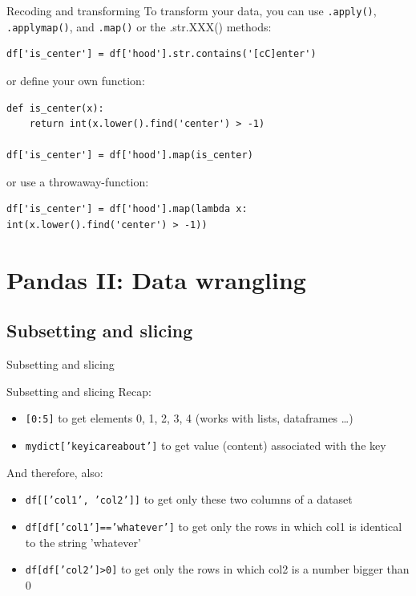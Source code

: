 \documentclass{beamer}
\begin{document}
\begin{frame}[fragile]{Recoding and transforming}
To transform your data, you can use \texttt{.apply()}, \texttt{.applymap()}, and \texttt{.map()} or the .str.XXX() methods:

\begin{lstlisting}
df['is_center'] = df['hood'].str.contains('[cC]enter')
\end{lstlisting}
or define your own function:
\begin{lstlisting}
def is_center(x):
    return int(x.lower().find('center') > -1)
    
df['is_center'] = df['hood'].map(is_center)
\end{lstlisting}
or use a throwaway-function:
\begin{lstlisting}
df['is_center'] = df['hood'].map(lambda x: int(x.lower().find('center') > -1))
\end{lstlisting}


\end{frame}




\section{Pandas II: Data wrangling}
\subsection{Subsetting and slicing}

\begin{frame}[plain]
Subsetting and slicing
\end{frame}

\begin{frame}{Subsetting and slicing}
Recap:
\begin{itemize}[<+->]
	\item \texttt{[0:5]} to get elements 0, 1, 2, 3, 4 (works with lists, dataframes \ldots)
	\item \texttt{mydict['keyicareabout']} to get value (content) associated with the key
\end{itemize}

\pause

And therefore, also:

\begin{itemize}[<+->]
	\item \texttt{df[['col1', 'col2']]} to get only these two columns of a dataset
	\item \texttt{df[df['col1']=='whatever']} to get only the rows in which col1 is identical to the string 'whatever'
	\item \texttt{df[df['col2']>0]} to get only the rows in which col2 is a number bigger than 0
\end{itemize}


\end{frame}
\end{document}
